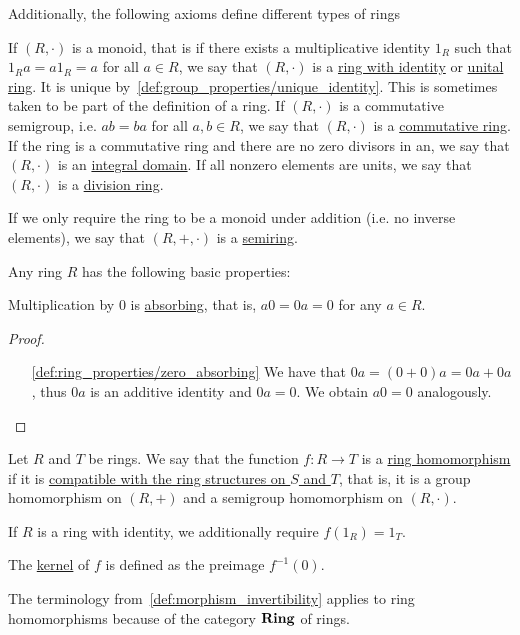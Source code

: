 \begin{definition}
  Additionally, the following axioms define different types of rings
  \begin{description}
     If $(R, \cdot)$ is a monoid, that is if there exists a multiplicative identity $1_R$ such that $1_R a = a1_R = a$ for all $a \in R$, we say that $(R, \cdot)$ is a \uline{ring with identity} or \uline{unital ring}. It is unique by~\cref{def:group_properties/unique_identity}. This is sometimes taken to be part of the definition of a ring.
     If $(R, \cdot)$ is a commutative semigroup, i.e. $ab = ba$ for all $a, b \in R$, we say that $(R, \cdot)$ is a \uline{commutative ring}.
     If the ring is a commutative ring and there are no zero divisors in an, we say that $(R, \cdot)$ is an \uline{integral domain}.
     If all nonzero elements are units, we say that $(R, \cdot)$ is a \uline{division ring}.
  \end{description}

  If we only require the ring to be a monoid under addition (i.e. no inverse elements), we say that $(R, +, \cdot)$ is a \uline{semiring}.
\end{definition}

\begin{proposition}\label{def:ring_properties}
  Any ring $R$ has the following basic properties:
  \begin{defenum}
    \item\label{def:ring_properties/zero_absorbing} Multiplication by $0$ is \uline{absorbing}, that is, $a0 = 0a = 0$ for any $a \in R$.
  \end{defenum}
\end{proposition}
\begin{proof}\mbox{}
  \begin{itemize}
    \item[\ref{def:ring_properties/zero_absorbing}] We have that $0a = (0 + 0)a = 0a + 0a$, thus $0a$ is an additive identity and $0a = 0$. We obtain $a0 = 0$ analogously.
  \end{itemize}
\end{proof}

\begin{definition}\label{def:ring_homomorphism}
  Let $R$ and $T$ be rings. We say that the function $f: R \to T$ is a \uline{ring homomorphism} if it is \uline{compatible with the ring structures on $S$ and $T$}, that is, it is a group homomorphism on $(R, +)$ and a semigroup homomorphism on $(R, \cdot)$.

  If $R$ is a ring with identity, we additionally require $f(1_R) = 1_T$.

  The \uline{kernel} of $f$ is defined as the preimage $f^{-1}(0)$.

  The terminology from~\cref{def:morphism_invertibility} applies to ring homomorphisms because of the category $\operatorname{\mathbf{Ring}}$ of rings.
\end{definition}

